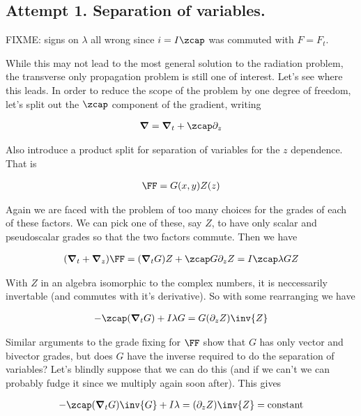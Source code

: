 \subsection{Attempt 1.  Separation of variables.}

FIXME: signs on $\lambda$ all wrong since $i = I\zcap$ was commuted with $F = F_t$.

While this may not lead to the most general solution to the radiation problem, the transverse only propagation problem is still one of interest.  Let's see where this leads.  In order to reduce the scope of the problem by one degree of freedom, let's split out the $\zcap$ component of the gradient, writing

\begin{align}\label{eqn:foo9}
\spacegrad = \spacegrad_t + \zcap \partial_z
\end{align}

Also introduce a product split for separation of variables for the $z$ dependence.  That is

\begin{align}\label{eqn:foo10}
\FF = G(x,y) Z(z)
\end{align}

Again we are faced with the problem of too many choices for the grades of each of these factors.  We can pick one of these, say $Z$, to have only scalar and pseudoscalar grades so that the two factors commute.  Then we have

\begin{align*}
(\spacegrad_t + \spacegrad_z) \FF = (\spacegrad_t G) Z + \zcap G \partial_z Z = I \zcap \lambda G Z
\end{align*}

With $Z$ in an algebra isomorphic to the complex numbers, it is neccessarily invertable (and commutes with it's derivative).  So with some rearranging we have

\begin{align*}
-\zcap (\spacegrad_t G) + I \lambda G = G (\partial_z Z)\inv{Z} 
\end{align*}

Similar arguments to the grade fixing for $\FF$ show that $G$ has only vector and bivector grades, but does $G$ have the inverse required to do the separation of variables?  Let's blindly suppose that we can do this (and if we can't we can probably fudge it since we multiply again soon after).  This gives

\begin{align}\label{eqn:foo11}
-\zcap (\spacegrad_t G) \inv{G} + I \lambda  = (\partial_z Z)\inv{Z} = \text{constant}
\end{align}

